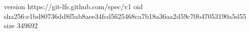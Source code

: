 version https://git-lfs.github.com/spec/v1
oid sha256:e1bd80736dd8f5ab8aee34fcd5625468ca7b18a36aa2d59c70b47053190a5d55
size 349692
